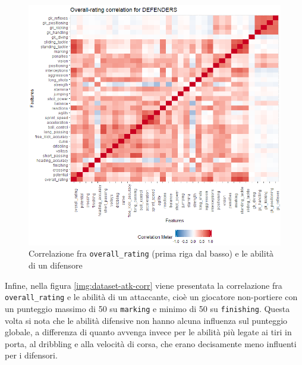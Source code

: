 \documentclass[hidelinks, 12pt]{article}
\begin{document}
\begin{figure}[H]
	\centering
	\includegraphics[scale=0.8]{images/04_04_def_corr.png}
	\caption[Correlazione fra \texttt{overall\_rating} (prima riga dal basso) e le abilità di un difensore]{Correlazione fra \texttt{overall\_rating} (prima riga dal basso) e le abilità di un difensore}
	\label{img:dataset-def-corr}
\end{figure}

Infine, nella figura \ref{img:dataset-atk-corr} viene presentata la correlazione fra \texttt{overall\_rating} e le abilità di un attaccante, cioè un giocatore non-portiere con un punteggio massimo di 50 su \texttt{marking} e minimo di 50 su \texttt{finishing}. Questa volta si nota che le abilità difensive non hanno alcuna influenza sul punteggio globale, a differenza di quanto avvenga invece per le abilità più legate ai tiri in porta, al dribbling e alla velocità di corsa, che erano decisamente meno influenti per i difensori.
\end{document}
